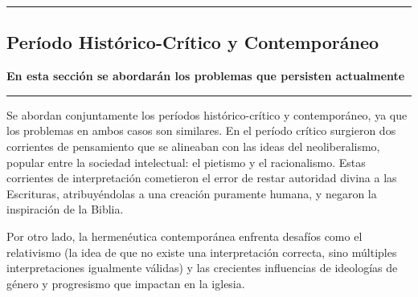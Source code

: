 {\color{gray}\hrule}
\begin{center}
\section{Período Histórico-Crítico y Contemporáneo}
\textbf{En esta sección se abordarán los problemas que persisten actualmente}
\end{center}
{\color{gray}\hrule}
\begin{multicols}{2}

Se abordan conjuntamente los períodos histórico-crítico y contemporáneo, ya que los problemas en ambos casos son similares. En el período crítico surgieron dos corrientes de pensamiento que se alineaban con las ideas del neoliberalismo, popular entre la sociedad intelectual: el pietismo y el racionalismo. Estas corrientes de interpretación cometieron el error de restar autoridad divina a las Escrituras, atribuyéndolas a una creación puramente humana, y negaron la inspiración de la Biblia.

Por otro lado, la hermenéutica contemporánea enfrenta desafíos como el relativismo (la idea de que no existe una interpretación correcta, sino múltiples interpretaciones igualmente válidas) y las crecientes influencias de ideologías de género y progresismo que impactan en la iglesia.

\end{multicols}
